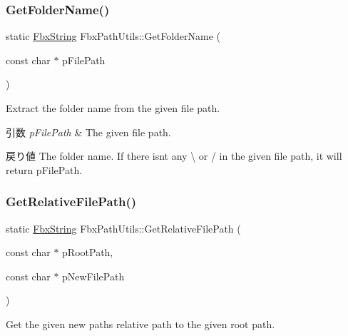 \subsubsection{\texorpdfstring{Get\+Folder\+Name()}{GetFolderName()}}
{\footnotesize\ttfamily static \hyperlink{class_fbx_string}{Fbx\+String} Fbx\+Path\+Utils\+::\+Get\+Folder\+Name (\begin{DoxyParamCaption}\item[{const char $\ast$}]{p\+File\+Path }\end{DoxyParamCaption})\hspace{0.3cm}{\ttfamily [static]}}

Extract the folder name from the given file path. 
\begin{DoxyParams}{引数}
{\em p\+File\+Path} & The given file path. \\
\hline
\end{DoxyParams}
\begin{DoxyReturn}{戻り値}
The folder name. If there isn\textquotesingle{}t any \textquotesingle{}\textbackslash{}\textquotesingle{} or \textquotesingle{}/\textquotesingle{} in the given file path, it will return p\+File\+Path. 
\end{DoxyReturn}
\mbox{\label{class_fbx_path_utils_a330b64c4fc722a47e0bb0a946249e021}} 
\subsubsection{\texorpdfstring{Get\+Relative\+File\+Path()}{GetRelativeFilePath()}}
{\footnotesize\ttfamily static \hyperlink{class_fbx_string}{Fbx\+String} Fbx\+Path\+Utils\+::\+Get\+Relative\+File\+Path (\begin{DoxyParamCaption}\item[{const char $\ast$}]{p\+Root\+Path,  }\item[{const char $\ast$}]{p\+New\+File\+Path }\end{DoxyParamCaption})\hspace{0.3cm}{\ttfamily [static]}}



Get the given new path\textquotesingle{}s relative path to the given root path. 

\mbox{\label{class_fbx_path_utils_a311c2fe8ecb6dad2fc1a3b7935378598}} 
